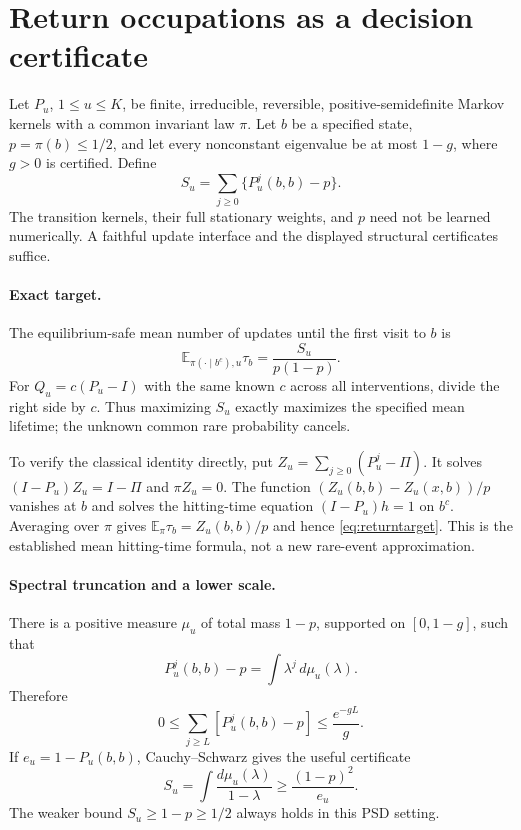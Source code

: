 \section{Return occupations as a decision certificate}
\label{sec:returncertificate}

Let $P_u$, $1\le u\le K$, be finite, irreducible, reversible,
positive-semidefinite Markov kernels with a common invariant law $\pi$.
Let $b$ be a specified state, $p=\pi(b)\le1/2$, and let every nonconstant
eigenvalue be at most $1-g$, where $g>0$ is certified.  Define
\[
 S_u=\sum_{j\ge0}\{P_u^j(b,b)-p\}.
\]
The transition kernels, their full stationary weights, and $p$ need not be
learned numerically.  A faithful update interface and the displayed
structural certificates suffice.

\paragraph{Exact target.}
The equilibrium-safe mean number of updates until the first visit to $b$ is
\begin{equation}
 \mathbb E_{\pi(\cdot\mid b^c),u}\tau_b
     =\frac{S_u}{p(1-p)}.
 \label{eq:returntarget}
\end{equation}
For $Q_u=c(P_u-I)$ with the same known $c$ across all interventions, divide
the right side by $c$.  Thus maximizing $S_u$ exactly maximizes the
specified mean lifetime; the unknown common rare probability cancels.

To verify the classical identity directly, put
$Z_u=\sum_{j\ge0}(P_u^j-\Pi)$.  It solves
$(I-P_u)Z_u=I-\Pi$ and $\pi Z_u=0$.  The function
$(Z_u(b,b)-Z_u(x,b))/p$ vanishes at $b$ and solves the hitting-time
equation $(I-P_u)h=1$ on $b^c$.  Averaging over $\pi$ gives
$\mathbb E_\pi\tau_b=Z_u(b,b)/p$ and hence
\eqref{eq:returntarget}.  This is the established mean hitting-time
formula, not a new rare-event approximation.

\paragraph{Spectral truncation and a lower scale.}
There is a positive measure $\mu_u$ of total mass $1-p$, supported on
$[0,1-g]$, such that
\[
 P_u^j(b,b)-p=\int\lambda^j\,d\mu_u(\lambda).
\]
Therefore
\[
 0\le\sum_{j\ge L}[P_u^j(b,b)-p]\le\frac{e^{-gL}}g.
\]
If $e_u=1-P_u(b,b)$, Cauchy--Schwarz gives the useful certificate
\begin{equation}
 S_u=\int\frac{d\mu_u(\lambda)}{1-\lambda}
 \ge\frac{(1-p)^2}{e_u}.
 \label{eq:returnscale}
\end{equation}
The weaker bound $S_u\ge1-p\ge1/2$ always holds in this PSD setting.

